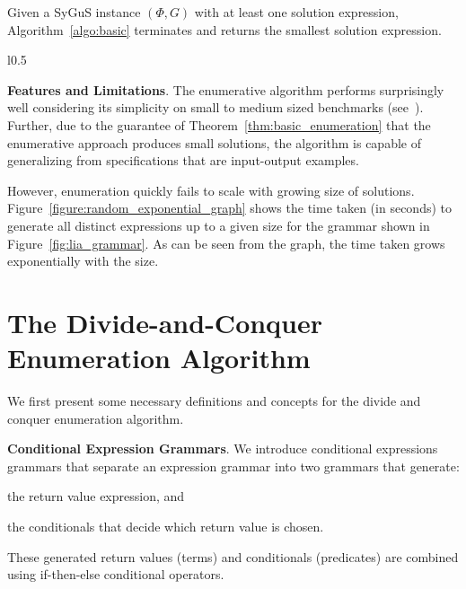 \documentclass{llncs}
\newcommand\Spec{\Phi}
\newcommand\Grammar{G}
\newcommand{\sygus}{{\sffamily\fontsize{8.5}{10}\selectfont
    SyGuS}\xspace}
\renewcommand{\paragraph}[1]{\par\noindent\textbf{#1}.}
\begin{document}
\begin{theorem}
  \label{thm:basic_enumeration}
  Given a \sygus instance $(\Spec, \Grammar)$ with at least one solution
  expression, Algorithm~\ref{algo:basic} terminates and returns the
  smallest solution expression.
\end{theorem}

\begin{wrapfigure}{l}{0.5\textwidth}
\centering
{}
\caption{Scalability of Enumeration}
\label{figure:random_exponential_graph}
\end{wrapfigure}
\paragraph{Features and Limitations}
The enumerative algorithm performs surprisingly well considering its
simplicity on small to medium sized benchmarks
(see~\cite{udupa-transit,udupa-sygus}).
Further, due to the guarantee of Theorem~\ref{thm:basic_enumeration}
that the enumerative approach produces small solutions, the algorithm is
capable of generalizing from specifications that are input-output
examples.

However, enumeration quickly fails to scale with growing size of
solutions.
Figure~\ref{figure:random_exponential_graph} shows the time taken (in seconds) to
generate all distinct expressions up to a given size for the grammar
shown in Figure~\ref{fig:lia_grammar}.
As can be seen from the graph, the time taken grows exponentially with
the size.



\section{The Divide-and-Conquer Enumeration Algorithm}
\label{sec:algo}

We first present some necessary definitions and concepts for the divide
and conquer enumeration algorithm.

\paragraph{Conditional Expression Grammars}
We introduce conditional expressions grammars that separate an
expression grammar into two grammars that generate:
\begin{inparaenum}[(a)]
\item the return value expression, and
\item the conditionals that decide which return value is chosen.
\end{inparaenum}
These generated return values (terms) and conditionals (predicates) are
combined using if-then-else conditional operators.
\end{document}
